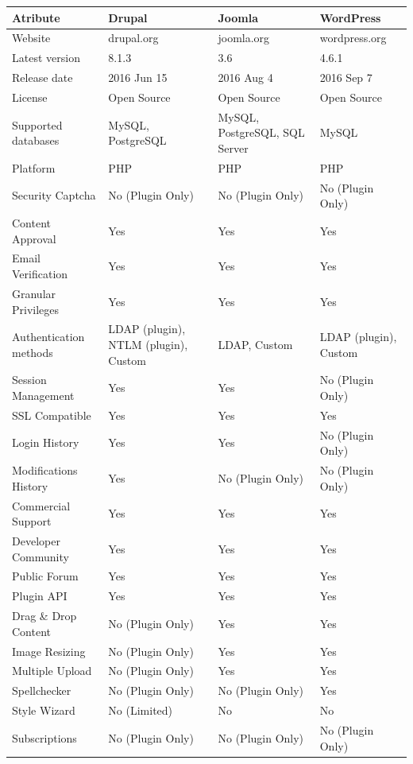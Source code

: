 \documentclass[12pt]{report}
\begin{document}
\tiny
\begin{longtable}[H]{|| p{.3\linewidth} | p{.19\linewidth} | p{.19\linewidth} | p{.19\linewidth} ||}
\hline
\textbf{Atribute} & \textbf{Drupal} & \textbf{Joomla} & \textbf{WordPress} \\
\hline\hline \endhead
Website & drupal.org & joomla.org & wordpress.org \\
Latest version & 8.1.3 & 3.6 & 4.6.1 \\
Release date & 2016 Jun 15 & 2016 Aug 4 & 2016 Sep 7 \\
License & Open Source & Open Source & Open Source \\
Supported databases & MySQL, PostgreSQL & MySQL, PostgreSQL, SQL Server & MySQL \\
Platform & PHP & PHP & PHP \\
Security Captcha & No (Plugin Only) & No (Plugin Only) & No (Plugin Only) \\
Content Approval & Yes & Yes & Yes \\
Email Verification & Yes & Yes & Yes \\
Granular Privileges & Yes & Yes & Yes \\
Authentication methods & LDAP (plugin), NTLM (plugin), Custom & LDAP, Custom & LDAP (plugin), Custom \\
Session Management & Yes & Yes & No (Plugin Only) \\
SSL Compatible & Yes & Yes & Yes \\
Login History & Yes & Yes & No (Plugin Only) \\
Modifications History & Yes & No (Plugin Only) & No (Plugin Only) \\
Commercial Support & Yes & Yes & Yes \\
Developer Community & Yes & Yes & Yes \\
Public Forum & Yes & Yes & Yes \\
Plugin API & Yes & Yes & Yes \\
Drag \& Drop Content & No (Plugin Only) & Yes & Yes \\
Image Resizing & No (Plugin Only) & Yes & Yes \\
Multiple Upload & No (Plugin Only) & Yes & Yes \\
Spellchecker & No (Plugin Only) & No (Plugin Only) & Yes \\
Style Wizard & No (Limited) & No & No \\
Subscriptions & No (Plugin Only) & No (Plugin Only) & No (Plugin Only) \\

\end{longtable}
\end{document}
